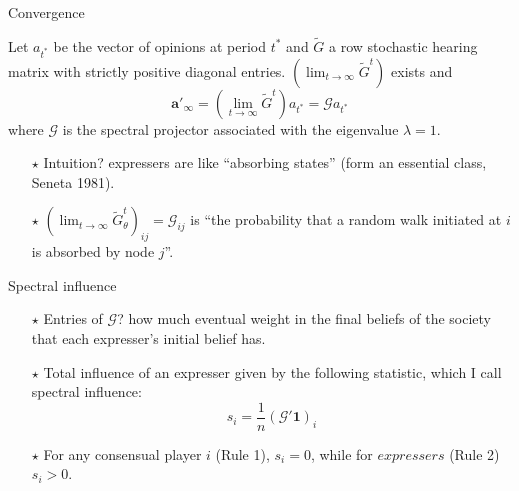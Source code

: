 \documentclass[xcolor=table,handout]{beamer}
\begin{document}
\begin{frame}{Convergence}\label{theorem1}

\begin{tcolorbox}[enhanced,attach boxed title to top center={yshift=-3mm,yshifttext=-1mm}, colback=red!5,colframe=red!40,colbacktitle=red!40 , title=Theorem, fonttitle=\bfseries,  boxed title style={size=small,colframe=red!50} ]
Let $a_{t^{*}}$ be the vector of opinions at period $t^{*}$ and $\tilde{G}$ a row stochastic hearing matrix with strictly positive diagonal entries. $(\lim_{t \rightarrow \infty} \tilde{G}^t)$ exists and  %
  $$\mathbf{a'}_{\infty} = (\lim_{t \rightarrow \infty} \tilde{G}^t) a_{t^{*}} = \mathcal{G} a_{t^{*}}$$ where $\mathcal{G} $ is the spectral projector associated with the eigenvalue $\lambda=1$.
\end{tcolorbox}
\hyperlink{prooftheorem}{}
\pause
\begin{itemize}
\item[$\star$] Intuition?  expressers are like ``absorbing states'' (form an essential class, Seneta 1981).
\item[$\star$] $(\lim_{t \rightarrow \infty} \tilde{G}_{\theta}^t )_{ij} = \mathcal{G}_{ij}$ is ``the probability that a random walk initiated at $i$ is absorbed by node $j$''.  
\end{itemize}
\end{frame}
%
\begin{frame}[noframenumbering]{Spectral influence}

\begin{itemize}
\item[$\star$]  Entries of $\mathcal{G}$? how much eventual weight in the final beliefs of the society that each expresser's initial belief has.  
\item[$\star$] Total influence of an expresser given by the following statistic, which I call spectral influence: 
\begin{equation*}
s_i = \frac{1}{n} (\mathcal{G}' \mathbf{1} )_{i}
\end{equation*}
\item[$\star$] {\color{pink} For any consensual player $i$ (Rule 1), $s_i = 0$, while for $expressers$ (Rule 2) $s_i > 0$.}

\end{itemize}
\end{frame}
\end{document}
